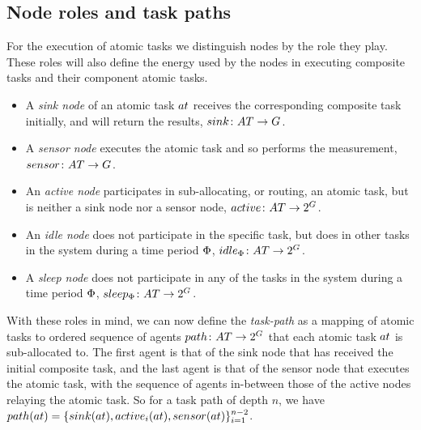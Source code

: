 \subsection{Node roles and task paths}
\label{section:roles}

\newcommand{\formalSinkRole}[2]{
	\functionFormal{sink}
	{\setAtomicTask{}{}}
	{\setAgents{}{}}
}
\newcommand{\formalSenseRole}[2]{
	\functionFormal{sensor}
	{\setAtomicTask{}{}}
	{\setAgents{}{}}
}
\newcommand{\formalActiveRole}[2]{
	\functionFormal{active}
	{\setAtomicTask{}{}}
	{\powerSetAgents{}{}}
}
\newcommand{\formalIdleRole}[2]{
	\functionFormal{idle_{\setTime{}{}}}
	{\setAtomicTask{}{}}
	{\powerSetAgents{}{}}
}
\newcommand{\formalSleepRole}[2]{
	\functionFormal{sleep_{\setTime{}{}}}
	{\setAtomicTask{}{}}
	{\powerSetAgents{}{}}
}
\newcommand{\functionSinkRole}[2]{\functionSignature{sink}{\varAtomicTask{}{}}}
	
\newcommand{\functionSenseRole}[2]{\functionSignature{sensor}{\varAtomicTask{}{}}}
\newcommand{\functionActiveRole}[2]{\functionSignature{active_{#1}}{\varAtomicTask{}{}}}
\newcommand{\functionIdleRole}[2]{\functionSignature{idle}{\varAtomicTask{}{}}}
\newcommand{\functionSleepRole}[2]{\functionSignature{sleep}{\varAtomicTask{}{}}}

For the execution of atomic tasks we distinguish nodes by the role they play. These roles will also define the energy used by the nodes in executing composite tasks and their component atomic tasks.
\begin{itemize}
	\item A \textit{sink node} of an atomic task $\varAtomicTask{}{}$ receives the corresponding composite task initially, and will return the results, $\formalSinkRole{}{}$.
	\item A \textit{sensor node} executes the atomic task and so performs the measurement, $\formalSenseRole{}{}$.
	\item An \textit{active node} participates in sub-allocating, or routing, an atomic task, but is neither a sink node nor a sensor node, $\formalActiveRole{}{}$.
	\item An \textit{idle node} does not participate in the specific task, but does in other tasks in the system during a time period $\Phi$, $\formalIdleRole{}{}$.
	\item A \textit{sleep node} does not participate in any of the tasks in the system during a time period $\Phi$, $\formalSleepRole{}{}$.
\end{itemize}
With these roles in mind, we can now define the  \textit{task-path} as a mapping of atomic tasks to ordered sequence of agents $\formalTaskArc{}{}$ that each atomic task $\varAtomicTask{}{}$ is sub-allocated to. The first agent is that of the sink node that has received the initial composite task, and the last agent is that of the sensor node that executes the atomic task, with the sequence of agents in-between those of the active nodes relaying the atomic task. So for a task path of depth $n$, we have
$\functionTaskArc{}{} = \lbrace \functionSinkRole{}{}, \functionActiveRole{i}{}, \functionSenseRole{}{} \rbrace_{i=1}^{n-2}$. 
